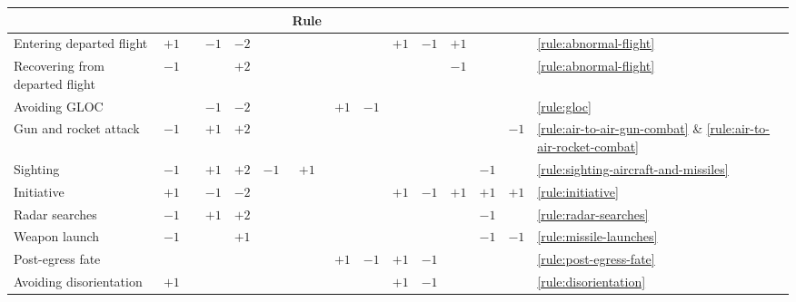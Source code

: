 \begin{twocolumntable}
{\begin{tabularx}{1.0\linewidth}{l*{13}{C}l}
&&
&&&
&Rule\\
\midrule
Entering departed flight        &$+1$&    &$-1$&$-2$&     &     &    &     &$+1$&$-1$&$+1$ &    &    
&\ref{rule:abnormal-flight}\\
Recovering from departed flight &$-1$&    &    &$+2$&     &     &    &     &    &    &$-1$ &    &    
&\ref{rule:abnormal-flight}\\
Avoiding GLOC                   &    &    &$-1$&$-2$&     &     &$+1$&$-1$ &    &    &     &    &    
&\ref{rule:gloc}\\
Gun and rocket attack           &$-1$&    &$+1$&$+2$&     &     &    &     &    &    &     &    &$-1$
&\ref{rule:air-to-air-gun-combat} \& \ref{rule:air-to-air-rocket-combat}\\
Sighting                        &$-1$&    &$+1$&$+2$& $-1$&$+1$ &    &     &    &    &     &$-1$&    
&\ref{rule:sighting-aircraft-and-missiles}\\
Initiative                      &$+1$&    &$-1$&$-2$&     &     &    &     &$+1$&$-1$& $+1$&$+1$&$+1$
&\ref{rule:initiative}\\
Radar searches                  &$-1$&    &$+1$&$+2$&     &     &    &     &    &    &     &$-1$&    
&\ref{rule:radar-searches}\\
Weapon launch                   &$-1$&    &    &$+1$&     &     &    &     &    &    &     &$-1$&$-1$
&\ref{rule:missile-launches}\\
Post-egress fate                &    &    &    &    &     &     &$+1$&$-1$ &$+1$&$-1$&     &    &    
&\ref{rule:post-egress-fate}\\
Avoiding disorientation         &$+1$&    &    &     &    &     &    &     &$+1$&$-1$&     &    &    
&\ref{rule:disorientation}\\
\bottomrule
\end{tabularx}
}
\end{twocolumntable}
